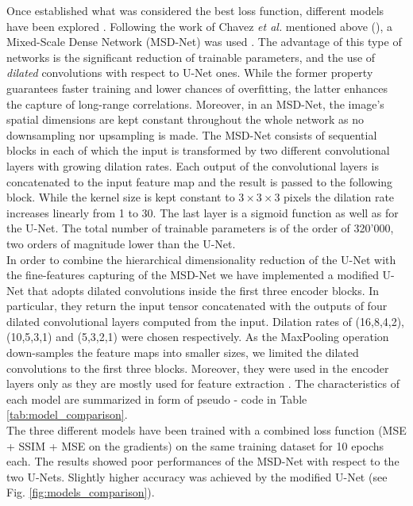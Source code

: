 Once established what was considered the best loss function, different models have been explored . 
Following the work of Chavez \textit{et al.} mentioned above (\cite{chavez_comparison_2022}), a 
Mixed-Scale Dense Network (MSD-Net) was used \cite{MSD_Pelt2017}. The advantage of this type of networks is the significant reduction of trainable
parameters, and the use of \textit{dilated} convolutions with respect to U-Net ones. While the former property guarantees
faster training and lower chances of overfitting, the latter enhances the capture of long-range correlations. Moreover, 
in an MSD-Net, the image's spatial dimensions are kept constant throughout the whole network as no downsampling nor upsampling is made.
The MSD-Net consists of sequential blocks in each of which the input is transformed by two different 
convolutional layers with growing dilation rates. Each output of the convolutional layers is concatenated to the input 
feature map and the result is passed to the following block. While the kernel size is kept constant to $3\times3\times3$ pixels
the dilation rate increases linearly from 1 to 30. The last layer is a sigmoid function as well as for the U-Net. 
The total number of trainable parameters is of the order of 320'000, two orders of magnitude lower than the U-Net.
\\
In order to combine the hierarchical dimensionality reduction of the U-Net with the fine-features capturing of the MSD-Net 
we have implemented a modified U-Net that adopts dilated convolutions inside the first three encoder blocks. In particular, 
they return the input tensor concatenated with the outputs of four dilated convolutional layers computed
from the input. Dilation rates of (16,8,4,2), (10,5,3,1) and (5,3,2,1) were chosen respectively. As the MaxPooling 
operation down-samples the feature maps into smaller sizes, we limited the dilated convolutions to the first three 
blocks. Moreover, they were used in the encoder layers only as they are mostly used for feature extraction \cite{dilated_conv}.
The characteristics of each model are summarized in form of pseudo - code in Table \ref{tab:model_comparison}.
\\

The three different models have been trained with a combined loss function (MSE + SSIM + MSE on the gradients) on the 
same training dataset for 10 epochs each.  The results showed poor performances of the MSD-Net with respect to the two 
U-Nets. Slightly higher accuracy was achieved by the modified U-Net (see Fig. \ref{fig:models_comparison}). 

